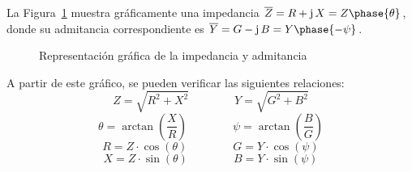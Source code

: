 \documentclass[11pt]{book} %
\numberwithin{dummy}{section}
\theoremstyle{ocrenumbox}
\theoremstyle{blacknumex}
\theoremstyle{blacknumbox}
\theoremstyle{ocrenum}
\newlength\esp
\begin{document}
	La Figura~\ref{fig.impedancia_admitancia} muestra gráficamente una impedancia $\overline{Z}=R+\mathrm{j}\,X=Z\phase{\theta}$, donde su admitancia correspondiente es $\overline{Y}=G-\mathrm{j}\,B=Y\phase{-\psi}$.
	\begin{figure}[htbp]
		\centering
		\hfil
		\caption{Representación gráfica de la impedancia y admitancia}
		\label{fig.impedancia_admitancia}
	\end{figure}
	A partir de este gráfico, se pueden verificar las siguientes relaciones: 
	\begin{equation*}
		Z=\sqrt{R^2+X^2}\qquad\qquad Y=\sqrt{G^2+B^2}
	\end{equation*}
	\begin{equation*}
		\theta=\arctan\left(\dfrac{X}{R}\right) \qquad\qquad \psi=\arctan\left(\dfrac{B}{G}\right)
	\end{equation*}
	\begin{equation*}
		R=Z\cdot \cos(\theta)\qquad\qquad G=Y\cdot \cos(\psi)
	\end{equation*}
	\begin{equation*}
		X=Z\cdot \sin(\theta)\qquad\qquad B=Y\cdot \sin(\psi)
	\end{equation*}
	
	
	
\end{document}
